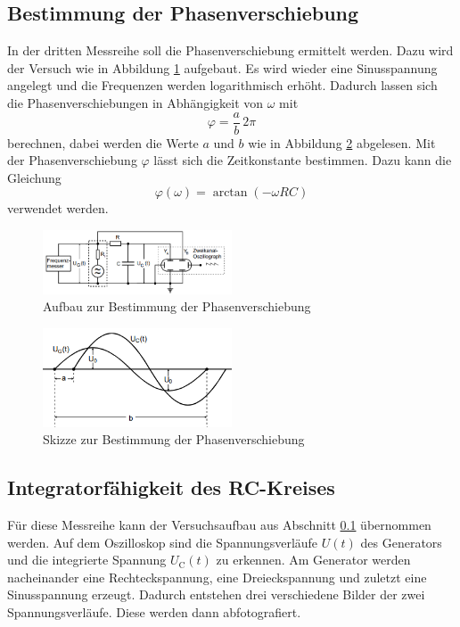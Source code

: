 \subsection{Bestimmung der Phasenverschiebung}
\label{subsec:Phase}
In der dritten Messreihe soll die Phasenverschiebung ermittelt werden. Dazu wird der Versuch wie in Abbildung \ref{fig:aufbauphi} aufgebaut.
Es wird wieder eine Sinusspannung angelegt und die Frequenzen werden logarithmisch erhöht.
Dadurch lassen sich die Phasenverschiebungen in Abhängigkeit von $\omega$ mit
\begin{equation}
    \varphi=\frac{a}{b} \, 2 \pi \label{eqn:phiab}
\end{equation}
berechnen, dabei werden die Werte $a$ und $b$ wie in Abbildung \ref{fig:wertphi} abgelesen.
Mit der Phasenverschiebung $\varphi$ lässt sich die Zeitkonstante bestimmen. Dazu kann die Gleichung
\begin{equation}
    \label{eqn:ficken}
    \varphi (\omega)=\arctan (-\omega RC)
\end{equation}
verwendet werden.
\begin{figure}
    \centering
    \caption{Aufbau zur Bestimmung der Phasenverschiebung} 
    \label{fig:aufbauphi}
    \includegraphics[width = 0.5\textwidth]{pics/phasenverschiebung.png}
\end{figure}
\begin{figure}
    \centering
    \caption{Skizze zur Bestimmung der Phasenverschiebung} 
    \label{fig:wertphi}
    \includegraphics[width = 0.5\textwidth]{pics/werteabl.png}
\end{figure}
\subsection{Integratorfähigkeit des RC-Kreises}
Für diese Messreihe kann der Versuchsaufbau aus Abschnitt \ref{subsec:Phase} übernommen werden.
Auf dem Oszilloskop sind die Spannungsverläufe $U(t)$ des Generators und die integrierte Spannung $U_\text{C}(t)$ zu erkennen.
Am Generator werden nacheinander eine Rechteckspannung, eine Dreieckspannung und zuletzt eine Sinusspannung erzeugt.
Dadurch entstehen drei verschiedene Bilder der zwei Spannungsverläufe. Diese werden dann abfotografiert. 